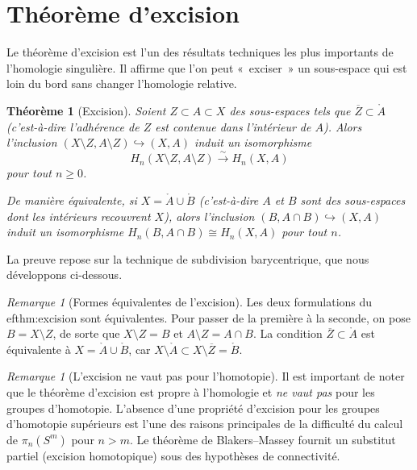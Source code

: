 \documentclass[12pt,a4paper,openany]{book}
\theoremstyle{definition}
\theoremstyle{plain}
\newtheorem{theoreme}[definition]{Théorème}
\theoremstyle{remark}
\newtheorem{remarque}[definition]{Remarque}
\begin{document}
\section{Théorème d'excision}\label{sec:excision}

Le théorème d'excision est l'un des résultats techniques les plus importants de l'homologie
singulière. Il affirme que l'on peut «~exciser~» un sous-espace qui est loin du bord sans
changer l'homologie relative.

\begin{theoreme}[Excision]\label{thm:excision}
Soient $Z \subset A \subset X$ des sous-espaces tels que $\overline{Z} \subset \mathring{A}$
(c'est-à-dire l'adhérence de $Z$ est contenue dans l'intérieur de $A$). Alors l'inclusion
$(X \setminus Z, A \setminus Z) \hookrightarrow (X, A)$ induit un isomorphisme
\[
  H_n(X \setminus Z, A \setminus Z) \xrightarrow{\;\sim\;} H_n(X, A)
\]
pour tout $n \geq 0$.

De manière équivalente, si $X = \mathring{A} \cup \mathring{B}$ (c'est-à-dire $A$ et $B$ sont
des sous-espaces dont les intérieurs recouvrent $X$), alors l'inclusion
$(B, A \cap B) \hookrightarrow (X, A)$ induit un isomorphisme $H_n(B, A \cap B) \cong H_n(X, A)$
pour tout $n$.
\end{theoreme}

La preuve repose sur la technique de subdivision barycentrique, que nous développons ci-dessous.

\begin{remarque}[Formes équivalentes de l'excision]\label{rem:excision-equivalence}
Les deux formulations du 
ef{thm:excision} sont équivalentes. Pour passer de la première à la
seconde, on pose $B = X \setminus Z$, de sorte que $X \setminus Z = B$ et $A \setminus Z = A \cap B$.
La condition $\overline{Z} \subset \mathring{A}$ est équivalente à $X = \mathring{A} \cup \mathring{B}$,
car $X \setminus \mathring{A} \subset X \setminus \overline{Z} = \mathring{B}$.
\end{remarque}

\begin{remarque}[L'excision ne vaut pas pour l'homotopie]\label{rem:excision-pas-homotopie}
Il est important de noter que le théorème d'excision est propre à l'homologie et \emph{ne vaut
pas} pour les groupes d'homotopie. L'absence d'une propriété d'excision pour les groupes
d'homotopie supérieurs est l'une des raisons principales de la difficulté du calcul de $\pi_n(S^m)$
pour $n > m$. Le théorème de Blakers--Massey fournit un substitut partiel (excision homotopique)
sous des hypothèses de connectivité.
\end{remarque}
\end{document}
